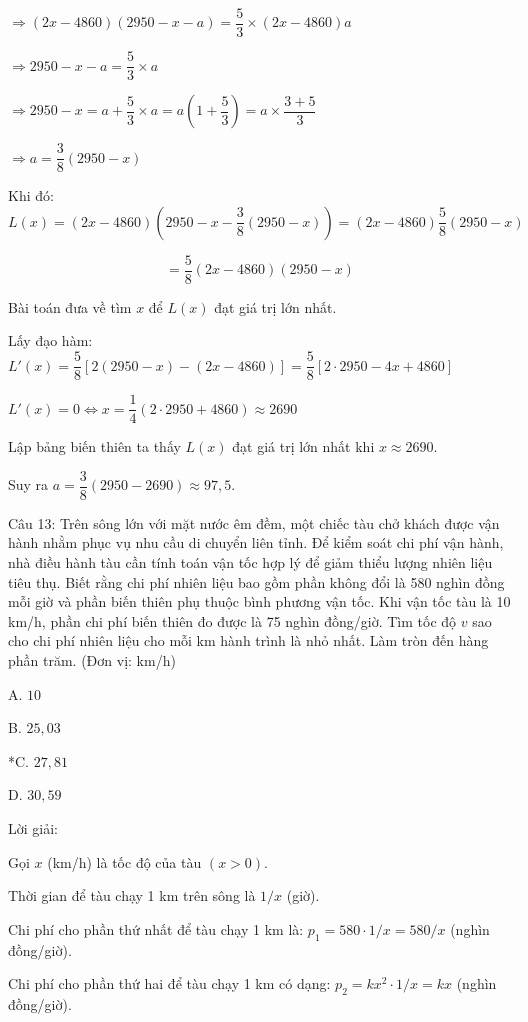 \documentclass[a4paper,12pt]{article}
\begin{document}
\(\Rightarrow (2x - 4860)(2950 - x - a) = \dfrac{5}{3} \times (2x - 4860)a\)

\(\Rightarrow 2950 - x - a = \dfrac{5}{3} \times a\)

\(\Rightarrow 2950 - x = a + \dfrac{5}{3} \times a = a\left(1 + \dfrac{5}{3}\right) = a \times \dfrac{3 + 5}{3}\)

\(\Rightarrow a = \dfrac{3}{8}(2950 - x)\)

Khi đó:
$$L(x) = (2x - 4860)\left(2950 - x - \dfrac{3}{8}(2950 - x)\right) = (2x - 4860) \dfrac{5}{8}(2950 - x)$$

$$= \dfrac{5}{8}(2x - 4860)(2950 - x)$$

Bài toán đưa về tìm \(x\) để \(L(x)\) đạt giá trị lớn nhất.

Lấy đạo hàm: \(L'(x) = \dfrac{5}{8}[2(2950 - x) - (2x - 4860)] = \dfrac{5}{8}[2 \cdot 2950 - 4x + 4860]\)

\(L'(x) = 0 \Leftrightarrow x = \dfrac{1}{4}(2 \cdot 2950 + 4860) \approx 2690\)

Lập bảng biến thiên ta thấy \(L(x)\) đạt giá trị lớn nhất khi \(x \approx 2690\).

Suy ra \(a = \dfrac{3}{8}(2950 - 2690) \approx 97,5\).




Câu 13: Trên sông lớn với mặt nước êm đềm, một chiếc tàu chở khách được vận hành nhằm phục vụ nhu cầu di chuyển liên tỉnh. Để kiểm soát chi phí vận hành, nhà điều hành tàu cần tính toán vận tốc hợp lý để giảm thiểu lượng nhiên liệu tiêu thụ. Biết rằng chi phí nhiên liệu bao gồm phần không đổi là 580 nghìn đồng mỗi giờ và phần biến thiên phụ thuộc bình phương vận tốc. Khi vận tốc tàu là 10 km/h, phần chi phí biến thiên đo được là 75 nghìn đồng/giờ. Tìm tốc độ \(v\) sao cho chi phí nhiên liệu cho mỗi km hành trình là nhỏ nhất. Làm tròn đến hàng phần trăm. (Đơn vị: km/h)

A. \(10\)

B. \(25,03\)

*C. \(27,81\)

D. \(30,59\)

Lời giải:


Gọi \(x\) (km/h) là tốc độ của tàu \((x > 0)\).

Thời gian để tàu chạy 1 km trên sông là \(1/x\) (giờ).

Chi phí cho phần thứ nhất để tàu chạy 1 km là: \(p_1=580 \cdot 1/x=580/x\) (nghìn đồng/giờ).

Chi phí cho phần thứ hai để tàu chạy 1 km có dạng: \(p_2=k x^2 \cdot 1/x=k x\) (nghìn đồng/giờ).
\end{document}

